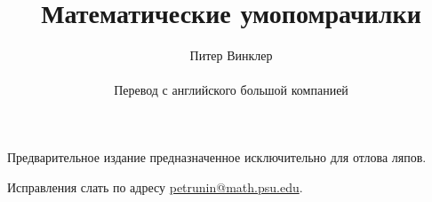 \documentclass[twoside]{book}
\def\thetitle{Математические умопомрачилки} %
\def\theauthor{Питер Винклер}
\begin{document}

\title{\thetitle}
\author{\theauthor\\
\\
Перевод с английского большой компанией}
\date{}
\maketitle

\thispagestyle{empty}

Предварительное издание предназначенное исключительно для отлова ляпов. 

Исправления слать по адресу 
\url{petrunin@math.psu.edu}.

\vfill















\appendix

{
\small

\printindex

}

{

\sloppy

\printbibliography[heading=bibintoc]


\fussy

}

\newpage

{

\tableofcontents

}
\end{document}
